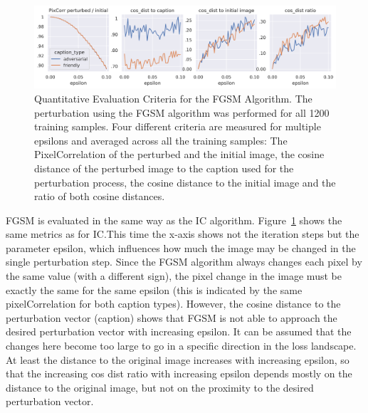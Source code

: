 \begin{figure}[ht]
    \centering
    \includegraphics[width=1\textwidth]{plots/advpert_validation_fgsm_loss_curves.png}
    \caption[Quantitative Evaluation Criteria for the FGSM Algorithm]{Quantitative Evaluation Criteria for the FGSM Algorithm. The perturbation using the FGSM algorithm was performed for all 1200 training samples. Four different criteria are measured for multiple epsilons and averaged across all the training samples: The PixelCorrelation of the perturbed and the initial image, the cosine distance of the perturbed image to the caption used for the perturbation process, the cosine distance to the initial image and the ratio of both cosine distances.}\label{fig:advpert_validation_fgsm_loss_curves}
\end{figure}

FGSM is evaluated in the same way as the IC algorithm. Figure~\ref{fig:advpert_validation_fgsm_loss_curves} shows the same metrics as for IC.\@ This time the x-axis shows not the iteration steps but the parameter epsilon, which influences how much the image may be changed in the single perturbation step. Since the FGSM algorithm always changes each pixel by the same value (with a different sign), the pixel change in the image must be exactly the same for the same epsilon (this is indicated by the same pixelCorrelation for both caption types). However, the cosine distance to the perturbation vector (caption) shows that FGSM is not able to approach the desired perturbation vector with increasing epsilon. It can be assumed that the changes here become too large to go in a specific direction in the loss landscape. At least the distance to the original image increases with increasing epsilon, so that the increasing cos dist ratio with increasing epsilon depends mostly on the distance to the original image, but not on the proximity to the desired perturbation vector. 

